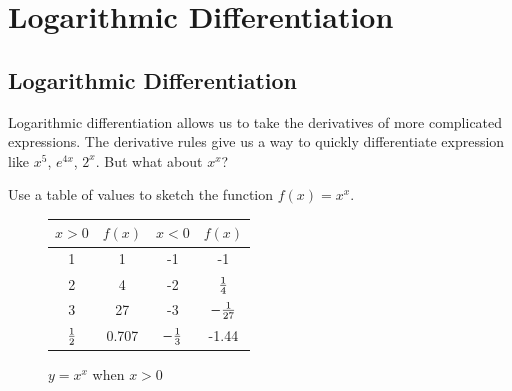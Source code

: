 \chapter{Logarithmic Differentiation}

\section{Logarithmic Differentiation}

Logarithmic differentiation allows us to take the derivatives of more complicated expressions. The derivative rules give us a way to quickly differentiate expression like $x^5$, $e^{4x}$, $ 2^x $. But what about $x^x$? \\

\begin{exercise}\nonumber
    Use a table of values to sketch the function $ f(x) = x^x $. \\

    \begin{figure}[H]
        \centering
        \begin{tabular}{|c|c|c|c|}
            \hline
            $ x > 0 $     & $ f(x) $ & $ x < 0 $        & $ f(x) $          \\
            \hline
            1             & 1        & -1               & -1                \\
            \hline
            2             & 4        & -2               & $ 1 \over 4 $     \\
            \hline
            3             & 27       & -3               & $ -{1 \over 27} $ \\
            \hline
            $ 1 \over 2 $ & 0.707    & $ -{1 \over 3} $ & -1.44             \\
            \hline
        \end{tabular}
    \end{figure}

    \begin{figure}[H]
        \centering
        \caption{$ y = x ^ x $ when $ x > 0 $}
    \end{figure}


\end{exercise}
